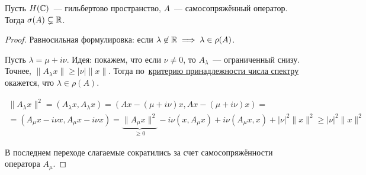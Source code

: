 \begin{theorem}[11.4]\label{11.4}
    Пусть $H(\mathbb{C})$~--- гильбертово пространство, $A$~--- самосопряжённый оператор.
    Тогда $\sigma(A) \subsetneq \mathbb{R}$.
\end{theorem}

\begin{proof}
Равносильная формулировка: если $\lambda \not\in \mathbb{R} \implies \lambda \in \rho(A)$.

Пусть $\lambda = \mu + i \nu$. Идея: покажем, что если $\nu \neq 0$, то $A_{\lambda}$~--- ограниченный снизу. Точнее, $\|A_\lambda x \| \geqslant |\nu| \| x \|$. Тогда по~\hyperref[11.3]{критерию принадлежности числа спектру} окажется, что $\lambda \in \rho(A)$.

\begin{multline*}
\|A_{\lambda} x\|^2 = (A_{\lambda} x, A_{\lambda} x) = 
(Ax - (\mu + i \nu) x, Ax - (\mu + i \nu) x) = \\
= (A_{\mu} x - i \nu x, A_{\mu} x - i \nu x)
= \underbrace{\|A_{\mu} x\|^2}_{\geqslant 0}
- i \nu (x, A_{\mu} x) + i \nu (A_{\mu}x, x) +
|\nu|^2 \|x\|^2 \geqslant |\nu|^2 \|x\|^2
\end{multline*}

В последнем переходе слагаемые сократились за счет самосопряжённости оператора $A_{\mu}$.

\end{proof}
